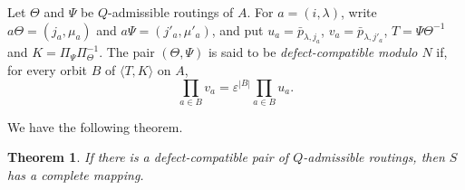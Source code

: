 \documentclass[11pt]{article}
\theoremstyle{plain}
\newtheorem{theorem}{Theorem}[section]
\theoremstyle{remark}
\theoremstyle{definition}
\theoremstyle{plain}
\begin{document}
Let $\Theta$ and $\Psi$ be $Q$-admissible routings of $A$. For
$a=(i,\lambda)$, write $a\Theta=(j_a,\mu_a)$ and
$a\Psi=(j'_a,\mu'_a)$, and put $u_a=\bar p_{\lambda,j_a}$,
$v_a=\bar p_{\lambda,j'_a}$, $T=\Psi\Theta^{-1}$ and
$K=\Pi_\Psi\Pi_\Theta^{-1}$. The pair $(\Theta,\Psi)$ is said to be
\emph{defect-compatible modulo $N$} if, for every orbit $B$ of
$\langle T,K\rangle$ on $A$,
\begin{equation}\label{eq:Rees0-odd-defect-condition}
        \prod_{a\in B}v_a
        =
        \varepsilon^{|B|}\prod_{a\in B}u_a.
\end{equation}

We have the following theorem.

\begin{theorem}\label{t:Rees0-odd-defect-switch}
If there is a defect-compatible pair of $Q$-admissible routings, then $S$
has a complete mapping.
\end{theorem}
\endgroup
\end{document}
